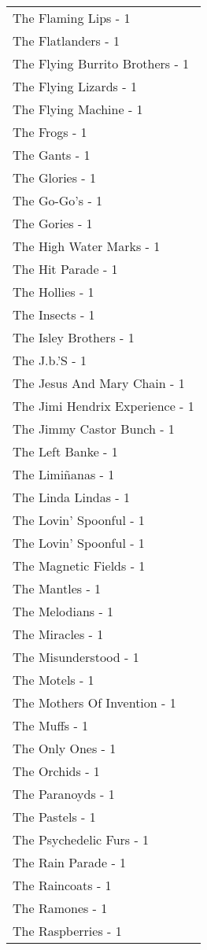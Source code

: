 \documentclass[
]{article}
\begin{document}
\begin{longtable}{l}
The Flaming Lips - 1 \\ 
The Flatlanders - 1 \\ 
The Flying Burrito Brothers - 1 \\ 
The Flying Lizards - 1 \\ 
The Flying Machine - 1 \\ 
The Frogs - 1 \\ 
The Gants - 1 \\ 
The Glories - 1 \\ 
The Go-Go's - 1 \\ 
The Gories - 1 \\ 
The High Water Marks - 1 \\ 
The Hit Parade - 1 \\ 
The Hollies - 1 \\ 
The Insects - 1 \\ 
The Isley Brothers - 1 \\ 
The J.b.'S - 1 \\ 
The Jesus And Mary Chain - 1 \\ 
The Jimi Hendrix Experience - 1 \\ 
The Jimmy Castor Bunch - 1 \\ 
The Left Banke - 1 \\ 
The Limiñanas - 1 \\ 
The Linda Lindas - 1 \\ 
The Lovin' Spoonful - 1 \\ 
The Lovin’ Spoonful - 1 \\ 
The Magnetic Fields - 1 \\ 
The Mantles - 1 \\ 
The Melodians - 1 \\ 
The Miracles - 1 \\ 
The Misunderstood - 1 \\ 
The Motels - 1 \\ 
The Mothers Of Invention - 1 \\ 
The Muffs - 1 \\ 
The Only Ones - 1 \\ 
The Orchids - 1 \\ 
The Paranoyds - 1 \\ 
The Pastels - 1 \\ 
The Psychedelic Furs - 1 \\ 
The Rain Parade - 1 \\ 
The Raincoats - 1 \\ 
The Ramones - 1 \\ 
The Raspberries - 1 \\ 

\end{longtable}
\end{document}
